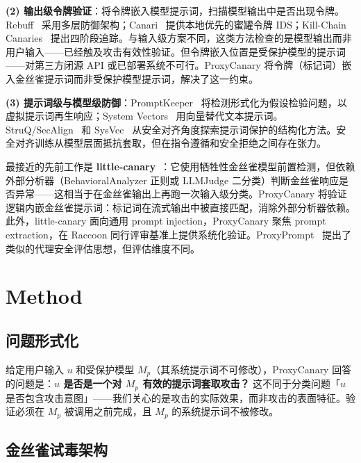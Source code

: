 \documentclass[11pt,a4paper]{ctexart}
\begin{document}
\textbf{(2) 输出级令牌验证}：将令牌嵌入模型提示词，扫描模型输出中是否出现令牌。Rebuff~\cite{rebuff2025} 采用多层防御架构；Canari~\cite{canari2025} 提供本地优先的蜜罐令牌 IDS；Kill-Chain Canaries~\cite{wang2024killchain} 提出四阶段追踪。与输入级方案不同，这类方法检查的是模型输出而非用户输入——已经触及攻击有效性验证。但令牌嵌入位置是受保护模型的提示词——对第三方闭源 API 或已部署系统不可行。ProxyCanary 将令牌（标记词）嵌入金丝雀提示词而非受保护模型提示词，解决了这一约束。

\textbf{(3) 提示词级与模型级防御}：PromptKeeper~\cite{jiang2025promptkeeper} 将检测形式化为假设检验问题，以虚拟提示词再生响应；System Vectors~\cite{psu2024systemvectors} 用向量替代文本提示词。StruQ/SecAlign~\cite{chen2025struq} 和 SysVec~\cite{zhang2025sysvec} 从安全对齐角度探索提示词保护的结构化方法。安全对齐训练从模型层面抵抗套取，但在指令遵循和安全拒绝之间存在张力。

最接近的先前工作是 \textbf{little-canary}~\cite{hermes2025little}：它使用牺牲性金丝雀模型前置检测，但依赖外部分析器（BehavioralAnalyzer 正则或 LLMJudge 二分类）判断金丝雀响应是否异常——这相当于在金丝雀输出上再跑一次输入级分类。ProxyCanary 将验证逻辑内嵌金丝雀提示词：标记词在流式输出中被直接匹配，消除外部分析器依赖。此外，little-canary 面向通用 prompt injection，ProxyCanary 聚焦 prompt extraction，在 Raccoon 同行评审基准上提供系统化验证。ProxyPrompt~\cite{lin2025proxyprompt} 提出了类似的代理安全评估思想，但评估维度不同。

\section{Method}

\subsection{问题形式化}

给定用户输入 $u$ 和受保护模型 $M_p$（其系统提示词不可修改），ProxyCanary 回答的问题是：\textbf{$u$ 是否是一个对 $M_p$ 有效的提示词套取攻击？} 这不同于分类问题「$u$ 是否包含攻击意图」——我们关心的是攻击的实际效果，而非攻击的表面特征。验证必须在 $M_p$ 被调用之前完成，且 $M_p$ 的系统提示词不被修改。

\subsection{金丝雀试毒架构}
\end{document}
